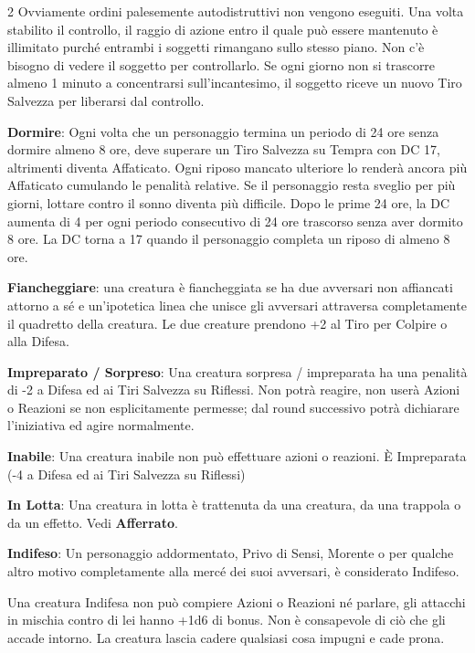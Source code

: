 \begin{multicols}{2}
Ovviamente ordini palesemente autodistruttivi non vengono eseguiti. Una volta stabilito il controllo, il raggio di azione entro il quale può essere mantenuto è illimitato purché entrambi i soggetti rimangano sullo stesso piano. Non c'è bisogno di vedere il soggetto per controllarlo. Se ogni giorno non si trascorre almeno 1 minuto a concentrarsi sull'incantesimo, il soggetto riceve un nuovo Tiro Salvezza per liberarsi dal controllo.

\textbf{Dormire}: Ogni volta che un personaggio termina un periodo di 24 ore senza dormire almeno 8 ore, deve superare un Tiro Salvezza su Tempra con DC 17, altrimenti diventa Affaticato. Ogni riposo mancato ulteriore lo renderà ancora più Affaticato cumulando le penalità relative.
Se il personaggio resta sveglio per più giorni, lottare contro il sonno diventa più difficile. Dopo le prime 24 ore, la DC aumenta di 4 per ogni periodo consecutivo di 24 ore trascorso senza aver dormito 8 ore. La DC torna a 17 quando il personaggio completa un riposo di almeno 8 ore.

\textbf{Fiancheggiare}: una creatura è fiancheggiata se ha due avversari non affiancati attorno a sé e un'ipotetica linea che unisce gli avversari attraversa completamente il quadretto della creatura. Le due creature prendono +2 al Tiro per Colpire o alla Difesa.

\textbf{Impreparato / Sorpreso}\label{impreparato}:
Una creatura sorpresa / impreparata ha una penalità di -2 a Difesa ed ai Tiri Salvezza su Riflessi. Non potrà reagire, non userà Azioni o Reazioni se non esplicitamente permesse; dal round successivo potrà dichiarare l'iniziativa ed agire normalmente.

\textbf{Inabile}: Una creatura inabile non può effettuare azioni o reazioni. È Impreparata (-4 a Difesa ed ai Tiri Salvezza su Riflessi)

\textbf{In Lotta}: Una creatura in lotta è trattenuta da una creatura, da una trappola o da un effetto. Vedi \textbf{Afferrato}.

\textbf{Indifeso}:\hypertarget{indifeso}{}\hypertarget{morente}{}\label{morente} Un personaggio addormentato, Privo di Sensi, Morente o per qualche altro motivo completamente alla mercé dei suoi avversari, è considerato Indifeso.

Una creatura Indifesa non può compiere Azioni o Reazioni né parlare, gli attacchi in mischia contro di lei hanno +1d6 di bonus. Non è consapevole di ciò che gli accade intorno. La creatura lascia cadere qualsiasi cosa impugni e cade prona.


\end{multicols}
